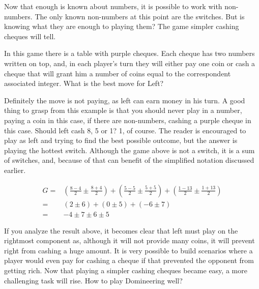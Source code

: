 

Now that enough is known about numbers, it is possible to work with non-numbers. The only known non-numbers at this point are the switches. But is knowing what they are enough to playing them? The game simpler cashing cheques will tell.

In this game there is a table with purple cheques. Each cheque has two numbers written on top, and, in each player's turn they will either pay one coin or cash a cheque that will grant him a number of coins equal to the correspondent associated integer. What is the best move for Left?

\begin{center}
\end{center}

Definitely the move is not paying, as left can earn money in his turn. A good thing to grasp from this example is that you should never play in a number, paying a coin in this case, if there are non-numbers, cashing a purple cheque in this case. Should left cash 8, 5 or 1? 1, of course. The reader is encouraged to play as left and trying to find the best possible outcome, but the answer is playing the hottest switch. Although the game above is not a switch, it is a sum of switches, and, because of that can benefit of the simplified notation discussed earlier.

\begin{align*}
	G =& (\frac{8-4}{2} \pm \frac{8+4}{2}) + (\frac{5-5}{2} \pm \frac{5+5}{2}) + (\frac{1-13}{2} \pm \frac{1+13}{2}) \\
	  =& (2 \pm 6) + (0 \pm 5) + (-6 \pm 7)\\
	  =& -4 \pm 7 \pm 6 \pm 5
\end{align*}

If you analyze the result above, it becomes clear that left must play on the rightmost component as, although it will not provide many coins, it will prevent right from cashing a huge amount. It is very possible to build scenarios where a player would even pay for cashing a cheque if that prevented the opponent from getting rich. Now that playing a simpler cashing cheques became easy, a more challenging task will rise. How to play Domineering well?

